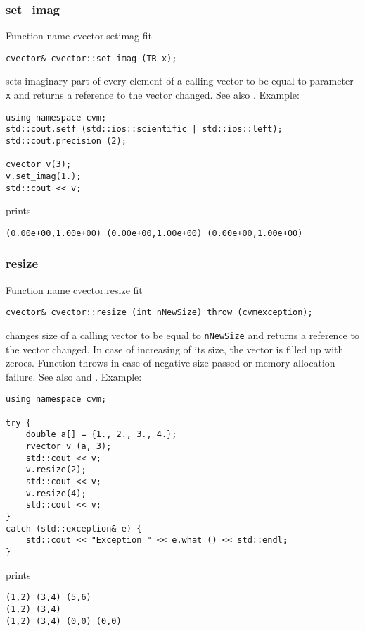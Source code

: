 \subsubsection{set\_imag}
Function%
\pdfdest name {cvector.setimag} fit
\begin{verbatim}
cvector& cvector::set_imag (TR x);
\end{verbatim}
sets imaginary part of every element of a calling vector to be equal to
parameter \verb"x"
and returns a reference to the vector changed.
See also .
Example:
\begin{Verbatim}
using namespace cvm;
std::cout.setf (std::ios::scientific | std::ios::left);
std::cout.precision (2);

cvector v(3);
v.set_imag(1.);
std::cout << v;
\end{Verbatim}
prints
\begin{Verbatim}
(0.00e+00,1.00e+00) (0.00e+00,1.00e+00) (0.00e+00,1.00e+00)
\end{Verbatim}
\newpage


\subsubsection{resize}
Function%
\pdfdest name {cvector.resize} fit
\begin{verbatim}
cvector& cvector::resize (int nNewSize) throw (cvmexception);
\end{verbatim}
changes  size of a calling vector to be equal to
\verb"nNewSize" and returns a reference to
the vector changed.
In case of increasing of its size, the vector
is filled up with zeroes.
Function throws  
in case of negative size passed or memory allocation failure.
See also  and
.
Example:
\begin{Verbatim}
using namespace cvm;

try {
    double a[] = {1., 2., 3., 4.};
    rvector v (a, 3);
    std::cout << v;
    v.resize(2);
    std::cout << v;
    v.resize(4);
    std::cout << v;
}
catch (std::exception& e) {
    std::cout << "Exception " << e.what () << std::endl;
}
\end{Verbatim}
prints
\begin{Verbatim}
(1,2) (3,4) (5,6)
(1,2) (3,4)
(1,2) (3,4) (0,0) (0,0)
\end{Verbatim}
\newpage


